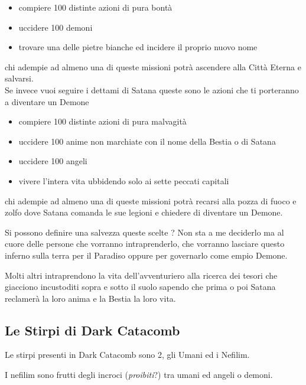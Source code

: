 \documentclass[12pt,a4paper,twoside,openany]{book}
\begin{document}
\begin{multicols}{2}
\begin{itemize}

\item compiere 100 distinte azioni di pura bontà
\item uccidere 100 demoni
\item trovare una delle pietre bianche ed incidere il proprio nuovo nome

\end{itemize}

chi adempie ad almeno una di queste missioni potrà ascendere alla Città Eterna e salvarsi.\\

Se invece vuoi seguire i dettami di Satana queste sono le azioni che ti porteranno a diventare un Demone

\begin{itemize}

\item compiere 100 distinte azioni di pura malvagità
\item uccidere 100 anime non marchiate con il nome della Bestia o di Satana
\item uccidere 100 angeli
\item vivere l'intera vita ubbidendo solo ai sette peccati capitali

\end{itemize}

chi adempie ad almeno una di queste missioni potrà recarsi alla pozza di fuoco e zolfo dove Satana comanda le sue legioni e chiedere di diventare un Demone.

Si possono definire una salvezza queste scelte ? Non sta a me deciderlo ma al cuore delle persone che vorranno intraprenderlo, che vorranno lasciare questo inferno sulla terra per il Paradiso oppure per governarlo come empio Demone.

Molti altri intraprendono la vita dell'avventuriero alla ricerca dei tesori che giacciono incustoditi sopra e sotto il suolo sapendo che prima o poi Satana reclamerà la loro anima e la Bestia la loro vita.

\subsection{Le Stirpi di Dark Catacomb}


Le stirpi presenti in Dark Catacomb sono 2, gli Umani ed i Nefilim.

I nefilim sono frutti degli incroci (\textit{proibiti}?) tra umani ed angeli o demoni.


\end{multicols}
\end{document}
